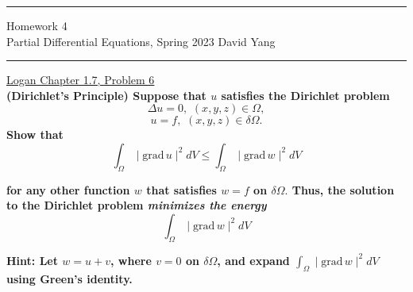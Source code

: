 \documentclass[11pt]{article}
\begin{document}
	\hrule
	\begin{center}
		{\Large Homework 4} \\ %
		\vspace{0.2cm}
		Partial Differential Equations, Spring 2023 \hfill David Yang %
	\end{center}

\hrule

\vspace{1em}

\underline{Logan Chapter 1.7, Problem 6} \\

\textbf{(Dirichlet's Principle) Suppose that $u$ satisfies the Dirichlet problem} \[ \Delta u = 0, \, \, (x, y, z) \in \Omega, \] \[ u = f, \, \, (x, y, z) \in \delta \Omega.\]
\textbf{Show that}
\[ \int_{\Omega} \mid \mathrm{grad} \, u \mid^2 dV \leq \int_{\Omega} \mid \mathrm{grad} \, w \mid^2 dV\]

\textbf{for any other function $w$ that satisfies $w = f$ on $\delta \Omega.$ Thus, the solution to the Dirichlet problem \textit{minimizes the energy} }
\[ \int_{\Omega} \mid \mathrm{grad} \, w \mid^2 dV \]

\textbf{Hint: Let $w = u+v$, where $v = 0$ on $\delta \Omega$, and expand $\int_{\Omega} \mid \mathrm{grad} \, w \mid^2 dV$ using Green's identity.}
\end{document}
